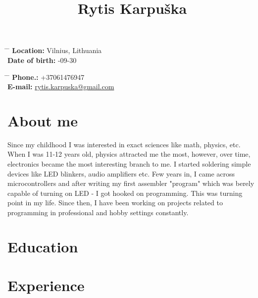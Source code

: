 \documentclass[12]{article}
\begin{document}
\title{Rytis Karpuška}


\parbox{0.5\textwidth}{ %
\begin{tabbing} %
\hspace{3cm} \= \hspace{4cm} \= \kill %
{\bf Location:} \> Vilnius, Lithuania\\ %
{\bf Date of birth:} -09-30\\ %
\end{tabbing}}
\hfill %
\parbox{0.5\textwidth}{ %
\begin{tabbing} %
\hspace{3cm} \= \hspace{4cm} \= \kill %
{\bf Phone.:} \> +37061476947 \\ %
{\bf E-mail:} \> \href{mailto:rytis.karpuska@gmail.com}{rytis.karpuska@gmail.com} \\ %
\end{tabbing}}

\section{About me}

Since my childhood I was interested in exact sciences like math, physics, etc.
When I was 11-12 years old, physics attracted me the most, however, over time, electronics became the most interesting branch to me.
I started soldering simple devices like LED blinkers, audio amplifiers etc.
Few years in, I came across microcontrollers and after writing my first assembler "program" which was berely capable of turning on LED - I got hooked on programming.
This was turning point in my life.
Since then, I have been working on projects related to programming in professional and hobby settings constantly.

\section{Education}


\section{Experience}
\end{document}
